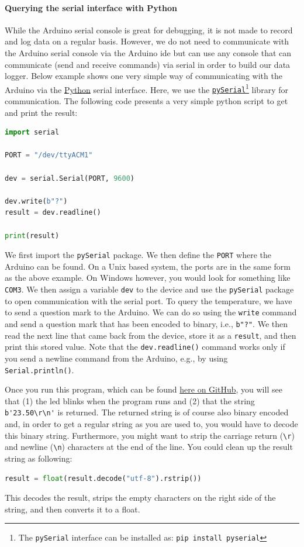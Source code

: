 \paragraph{Querying the serial interface with Python}
While the Arduino serial console is great for debugging, it is not made to record and log data on a regular basis. However, we do not need to communicate with the Arduino serial console via the Arduino \ac{ide} but can use any console that can communicate (send and receive commands) via serial in order to build our data logger. Below example shows one very simple way of communicating with the Arduino via the \href{https://www.python.org/}{Python} serial interface. Here, we use the \href{https://pyserial.readthedocs.io/en/latest/pyserial.html}{\texttt{pySerial}}\footnote{The \texttt{pySerial} interface can be installed as: \texttt{pip install pyserial}} library for communication. The following code presents a very simple python script to get and print the result:
\begin{lstlisting}[language=python]
import serial

PORT = "/dev/ttyACM1"

dev = serial.Serial(PORT, 9600)

dev.write(b"?")
result = dev.readline()

print(result)
\end{lstlisting}
We first import the \lstinline{pySerial} package. We then define the \lstinline{PORT} where the Arduino can be found. On a Unix based system, the ports are in the same form as the above example. On Windows however, you would look for something like \lstinline{COM3}. We then assign a variable \lstinline{dev} to the device and use the \lstinline{pySerial} package to open communication with the serial port. To query the temperature, we have to send a question mark to the Arduino. We can do so using the \lstinline{write} command and send a question mark that has been encoded to binary, i.e., \lstinline{b"?"}. We then read the next line that came back from the device, store it as a \lstinline{result}, and then print this stored value. Note that the \lstinline[language=python]{dev.readline()} command works only if you send a newline command from the Arduino, e.g., by using \lstinline{Serial.println()}.

Once you run this program, which can be found \href{https://github.com/galactic-forensics/workshop_arduino_electronics/blob/main/further_examples/data_logger/simple_query.py}{here on GitHub}, you will see that (1) the \ac{led} blinks when the program runs and (2) that the string \lstinline{b'23.50\r\n'} is returned. The returned string is of course also binary encoded and, in order to get a regular string as you are used to, you would have to decode this binary string. Furthermore, you might want to strip the carriage return (\lstinline{\r}) and newline (\lstinline{\n}) characters at the end of the line. You could clean up the result string as following:
\begin{lstlisting}[language=python]
result = float(result.decode("utf-8").rstrip())
\end{lstlisting}
This decodes the result, strips the empty characters on the right side of the string, and then converts it to a float. 

